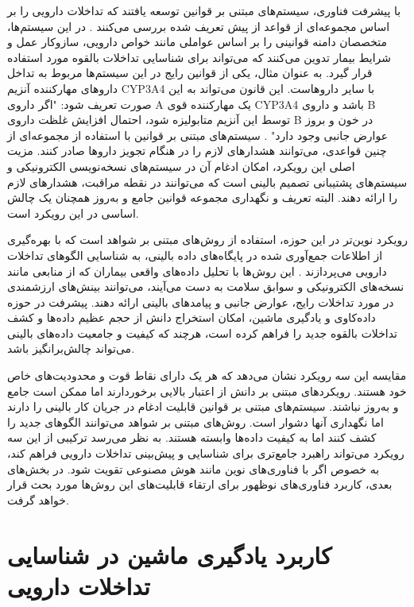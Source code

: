 با پیشرفت فناوری، سیستم‌های مبتنی بر قوانین توسعه یافتند که تداخلات دارویی را بر اساس مجموعه‌ای از قواعد از پیش تعریف شده بررسی می‌کنند \cite{ref_wang2017}. در این سیستم‌ها، متخصصان دامنه قوانینی را بر اساس عواملی مانند خواص دارویی، سازوکار عمل و شرایط بیمار تدوین می‌کنند که می‌تواند برای شناسایی تداخلات بالقوه مورد استفاده قرار گیرد. به عنوان مثال، یکی از قوانین رایج در این سیستم‌ها مربوط به تداخل داروهای مهارکننده آنزیم CYP3A4 با سایر داروهاست. این قانون می‌تواند به این صورت تعریف شود: "اگر داروی A یک مهارکننده قوی CYP3A4 باشد و داروی B توسط این آنزیم متابولیزه شود، احتمال افزایش غلظت داروی B در خون و بروز عوارض جانبی وجود دارد" \cite{ref_cascorbi2012}. سیستم‌های مبتنی بر قوانین با استفاده از مجموعه‌ای از چنین قواعدی، می‌توانند هشدارهای لازم را در هنگام تجویز داروها صادر کنند. مزیت اصلی این رویکرد، امکان ادغام آن در سیستم‌های نسخه‌نویسی الکترونیکی و سیستم‌های پشتیبانی تصمیم بالینی است که می‌توانند در نقطه مراقبت، هشدارهای لازم را ارائه دهند. البته تعریف و نگهداری مجموعه قوانین جامع و به‌روز همچنان یک چالش اساسی در این رویکرد است.

رویکرد نوین‌تر در این حوزه، استفاده از روش‌های مبتنی بر شواهد است که با بهره‌گیری از اطلاعات جمع‌آوری شده در پایگاه‌های داده بالینی، به شناسایی الگوهای تداخلات دارویی می‌پردازند \cite{ref_he2023}. این روش‌ها با تحلیل داده‌های واقعی بیماران که از منابعی مانند نسخه‌های الکترونیکی و سوابق سلامت به دست می‌آیند، می‌توانند بینش‌های ارزشمندی در مورد تداخلات رایج، عوارض جانبی و پیامدهای بالینی ارائه دهند. پیشرفت در حوزه داده‌کاوی و یادگیری ماشین، امکان استخراج دانش از حجم عظیم داده‌ها و کشف تداخلات بالقوه جدید را فراهم کرده است، هرچند که کیفیت و جامعیت داده‌های بالینی می‌تواند چالش‌برانگیز باشد.

مقایسه این سه رویکرد نشان می‌دهد که هر یک دارای نقاط قوت و محدودیت‌های خاص خود هستند. رویکردهای مبتنی بر دانش از اعتبار بالایی برخوردارند اما ممکن است جامع و به‌روز نباشند. سیستم‌های مبتنی بر قوانین قابلیت ادغام در جریان کار بالینی را دارند اما نگهداری آنها دشوار است. روش‌های مبتنی بر شواهد می‌توانند الگوهای جدید را کشف کنند اما به کیفیت داده‌ها وابسته هستند. به نظر می‌رسد ترکیبی از این سه رویکرد می‌تواند راهبرد جامع‌تری برای شناسایی و پیش‌بینی تداخلات دارویی فراهم کند، به خصوص اگر با فناوری‌های نوین مانند هوش مصنوعی تقویت شود. در بخش‌های بعدی، کاربرد فناوری‌های نوظهور برای ارتقاء قابلیت‌های این روش‌ها مورد بحث قرار خواهد گرفت.

\section{کاربرد یادگیری ماشین در شناسایی تداخلات دارویی}

